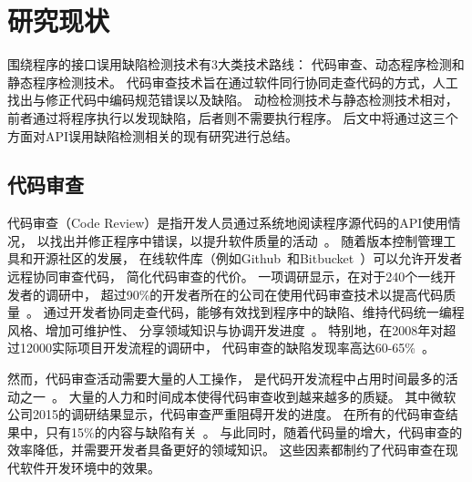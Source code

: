 



\section{研究现状}
围绕程序的接口误用缺陷检测技术有3大类技术路线：
代码审查、动态程序检测和静态程序检测技术。
代码审查技术旨在通过软件同行协同走查代码的方式，人工找出与修正代码中编码规范错误以及缺陷。
动检检测技术与静态检测技术相对，前者通过将程序执行以发现缺陷，后者则不需要执行程序。
后文中将通过这三个方面对API误用缺陷检测相关的现有研究进行总结。

\subsection{代码审查}
代码审查（Code Review）是指开发人员通过系统地阅读程序源代码的API使用情况，
以找出并修正程序中错误，以提升软件质量的活动~\cite{code-review}。
随着版本控制管理工具和开源社区的发展，
在线软件库（例如Github~\cite{github}和Bitbucket~\cite{bitbucket}）可以允许开发者远程协同审查代码，
简化代码审查的代价。
一项调研显示，在对于240个一线开发者的调研中，
超过90\%的开发者所在的公司在使用代码审查技术以提高代码质量~\cite{17-profes-code-review}。
通过开发者协同走查代码，能够有效找到程序中的缺陷、维持代码统一编程风格、增加可维护性、
分享领域知识与协调开发进度~\cite{13-icse-code-review}。
特别地，在2008年对超过12000实际项目开发流程的调研中，
代码审查的缺陷发现率高达60-65\%~\cite{08-code-review}。

然而，代码审查活动需要大量的人工操作，
是代码开发流程中占用时间最多的活动之一~\cite{13-esem-code-review}。
大量的人力和时间成本使得代码审查收到越来越多的质疑。
其中微软公司2015的调研结果显示，代码审查严重阻碍开发的进度。
在所有的代码审查结果中，只有15\%的内容与缺陷有关~\cite{15-icse-code-review}。
与此同时，随着代码量的增大，代码审查的效率降低，并需要开发者具备更好的领域知识。
这些因素都制约了代码审查在现代软件开发环境中的效果。


